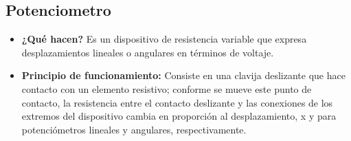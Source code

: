 \subsection*{Potenciometro}
\begin{itemize}
	\item \textbf{¿Qué hacen?} Es un dispositivo de resistencia variable que expresa desplazamientos lineales o angulares en términos de voltaje.
	\item \textbf{Principio de funcionamiento:} Consiste en una clavija deslizante que hace contacto con un elemento resistivo; conforme se mueve este punto de contacto, la resistencia entre el contacto deslizante y las conexiones de los extremos del dispositivo cambia en proporción al desplazamiento, x y  para potenciómetros lineales y angulares, respectivamente.
\end{itemize}	

